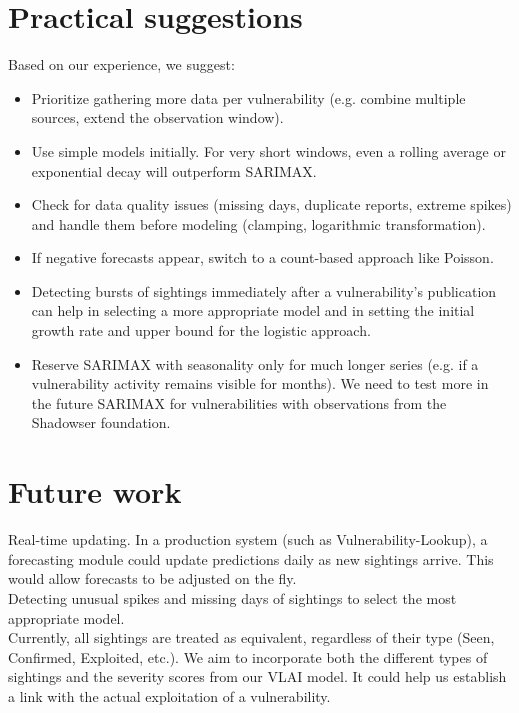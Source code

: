 \documentclass[]{article}
\begin{document}
\section{Practical suggestions}

Based on our experience, we suggest:

\begin{itemize}
 \item Prioritize gathering more data per vulnerability (e.g. combine multiple sources, extend the observation window).
 \item Use simple models initially. For very short windows, even a rolling average or exponential decay will outperform SARIMAX.
 \item Check for data quality issues (missing days, duplicate reports, extreme spikes) and handle them before modeling (clamping, logarithmic transformation).
 \item If negative forecasts appear, switch to a count-based approach like Poisson.
 \item Detecting bursts of sightings immediately after a vulnerability’s publication can help in selecting a more appropriate model and in setting the initial growth rate and upper bound for the logistic approach.
 \item Reserve SARIMAX with seasonality only for much longer series (e.g. if a vulnerability activity remains visible for months). We need to test more in the future SARIMAX for vulnerabilities with observations from the Shadowser foundation.
\end{itemize}


\section{Future work}
Real-time updating. In a production system (such as Vulnerability-Lookup), a forecasting module could update predictions daily as new sightings arrive. This would allow forecasts to be adjusted on the fly.\\
Detecting unusual spikes and missing days of sightings to select the most appropriate model.\\
Currently, all sightings are treated as equivalent, regardless of their type (Seen, Confirmed, Exploited, etc.). We aim to incorporate both the different types of sightings and the severity scores from our VLAI model. It could help us establish a link with the actual exploitation of a vulnerability.



{}

\end{document}
